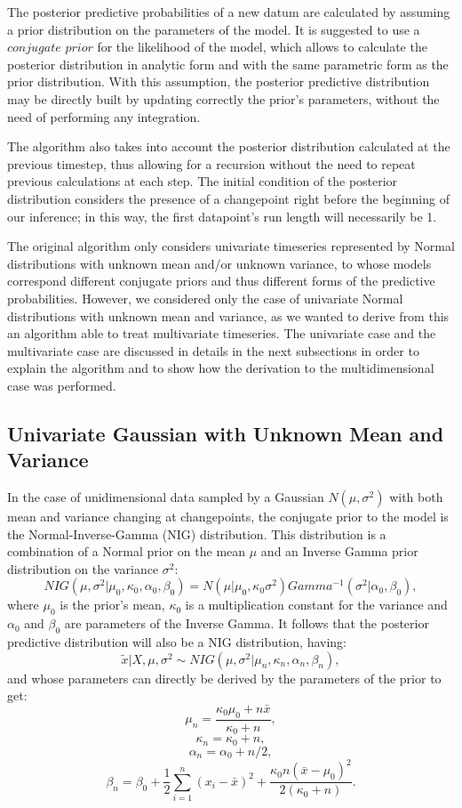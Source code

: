 \documentclass[a4paper]{article}
\begin{document}
The posterior predictive probabilities of a new datum are calculated by assuming a prior distribution on the parameters of the model. It is suggested to use a $conjugate$ $prior$ for the likelihood of the model, which allows to calculate the posterior distribution in analytic form and with the same parametric form as the prior distribution. With this assumption, the posterior predictive distribution may be directly built by updating correctly the prior's parameters, without the need of performing any integration.

The algorithm also takes into account the posterior distribution calculated at the previous timestep, thus allowing for a recursion without the need to repeat previous calculations at each step. The initial condition of the posterior distribution considers the presence of a changepoint right before the beginning of our inference; in this way, the first datapoint's run length will necessarily be 1.

The original algorithm only considers univariate timeseries represented by Normal distributions with unknown mean and/or unknown variance, to whose models correspond different conjugate priors and thus different forms of the predictive probabilities. However, we considered only the case of univariate Normal distributions with unknown mean and variance, as we wanted to derive from this an algorithm able to treat multivariate timeseries. The univariate case and the multivariate case are discussed in details in the next subsections in order to explain the algorithm and to show how the derivation to the multidimensional case was performed.

\subsection{Univariate Gaussian with Unknown Mean and Variance}

In the case of unidimensional data sampled by a Gaussian $N(\mu,\sigma^2)$ with both mean and variance changing at changepoints, the conjugate prior to the model is the Normal-Inverse-Gamma (NIG) distribution. This distribution is a combination of a Normal prior on the mean $\mu$ and an Inverse Gamma prior distribution on the variance $\sigma^2$:
\[NIG(\mu, \sigma^2 | \mu_0, \kappa_0, \alpha_0, \beta_0) = N(\mu | \mu_0, \kappa_0\sigma^2)Gamma^{-1}(\sigma^2 | \alpha_0, \beta_0),\]
where $\mu_0$ is the prior's mean, $\kappa_0$ is a multiplication constant for the variance and $\alpha_0$ and $\beta_0$ are parameters of the Inverse Gamma. It follows that the posterior predictive distribution will also be a NIG distribution, having:
\[\tilde{x} | X, \mu, \sigma^2  \sim NIG(\mu, \sigma^2 | \mu_n, \kappa_n, \alpha_n, \beta_n),\]
and whose parameters can directly be derived by the parameters of the prior to get:
\[\mu_n = \frac{\kappa_0\mu_0 + n\bar{x}}{\kappa_0 + n}, \]
\[\kappa_n = \kappa_0 + n,\]
\[\alpha_n = \alpha_0 + n/2,\]
\[\beta_n = \beta_0 + \frac{1}{2} \sum_{i=1}^{n} (x_i - \bar{x})^2 + \frac{\kappa_0n(\bar{x} - \mu_0)^2}{2(\kappa_0 + n)}. \]
\end{document}
